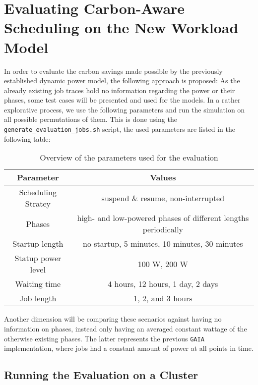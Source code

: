 \chapter{Evaluating Carbon-Aware Scheduling on the New Workload Model} \label{sec:evaluate_scheduling}

In order to evaluate the carbon savings made possible by the previously established dynamic power model, the following approach is proposed:
As the already existing job traces hold no information regarding the power or their phases, some test cases will be presented and used for the models.
In a rather explorative process, we use the following parameters and run the simulation on all possible permutations of them. 
This is done using the \verb|generate_evaluation_jobs.sh| script, the used parameters are listed in the following table:

\begin{table}[h!]
    \centering
    \begin{tabular}{|c|c|}
    \hline
        Parameter & Values \\ \hline
        Scheduling Stratey & suspend \& resume, non-interrupted \\ \hline
        Phases & high- and low-powered phases of different lengths periodically \\ \hline
        Startup length & no startup, 5 minutes, 10 minutes, 30 minutes \\ \hline
        Statup power level & 100 W, 200 W \\ \hline
        Waiting time & 4 hours, 12 hours, 1 day, 2 days \\ \hline
        Job length & 1, 2, and 3 hours \\ \hline
    \end{tabular}
    \caption{Overview of the parameters used for the evaluation}
    \label{tab:evaluation_parameters}
    \end{table}

Another dimension will be comparing these scenarios against having no information on phases, instead only having an averaged constant wattage of the otherwise existing phases.
The latter represents the previous \verb|GAIA| implementation, where jobs had a constant amount of power at all points in time.


\section{Running the Evaluation on a Cluster}

